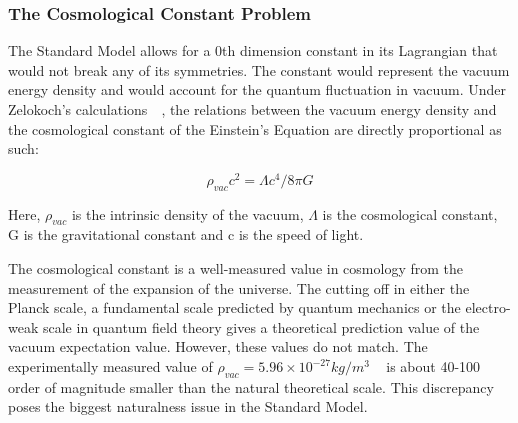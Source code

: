 {\subsubsection{The Cosmological Constant Problem}
The Standard Model allows for a 0th dimension constant in its Lagrangian that would not break any of its symmetries. The constant would represent the vacuum energy density and would account for the quantum fluctuation in vacuum. Under Zelokoch's calculations~~\cite{zel1968cosmological}, the relations between the vacuum energy density and the cosmological constant of the Einstein's Equation are directly proportional as such:

\begin{equation}
    \rho_{vac}c^2=\Lambda c^4/8\pi G
\label{eq:cosmoconst}
\end{equation}

Here, $\rho_{vac}$ is the intrinsic density of the vacuum, $\Lambda$ is the cosmological constant, G is the gravitational constant and c is the speed of light. 

The cosmological constant is a well-measured value in cosmology from the measurement of the expansion of the universe. The cutting off in either the Planck scale, a fundamental scale predicted by quantum mechanics or the electro-weak scale in quantum field theory gives a theoretical prediction value of the vacuum expectation value. However, these values do not match. The experimentally measured value of $\rho_{vac}= 5.96 \times 10^{-27} kg/m^{3}$ ~\cite{2016Planck} is about 40-100 order of magnitude smaller than the natural theoretical scale.
This discrepancy poses the biggest naturalness issue in the Standard Model.





}
